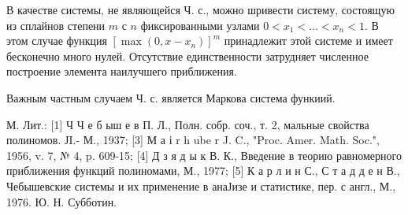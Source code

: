 \documentclass[10pt]{article}
\begin{document}
В качестве системы, не являющейся Ч. с., можно шривести систему, состоящую из сплайнов степени $m$ с $n$ фиксированными узлами $0<x_{1}<\ldots<x_{n}<1$. В этом случае функция $\left[\max \left(0, x-x_{n}\right)\right]^{m}$ принадлежит этой системе и имеет бесконечно много нулей. Отсутствие единственности затрудняет численное построение элемента наилучшего приближения.



Важным частным случаем Ч. с. является Маркова система функиий.



М. Лит.: [1] Ч Ч е б ыш е в П. Л., Полн. собр. соч., т. 2, мальные свойства полиномов. ЈI.- М., 1937; [3] М а і r h ube r J. C., "Proc. Amer. Math. Soc.", 1956, v. 7, № 4, p. 609-15; [4] Д з я д ы к В. К., Введение в теорию равномерного приближения функций полиномами, М., 1977; [5] К а р л и н С., С т а д д е н В., Чебышевские системы и их применение в анаЈизе и статистике, пер. с англ., М., 1976. Ю. Н. Субботин.
\end{document}
